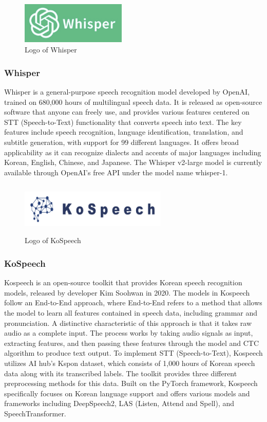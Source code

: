 \documentclass[conference]{IEEEtran}
\begin{document}
        \begin{figure}[htbp]
            \centerline{\includegraphics[width=5cm, height=2cm]{Images/logo/whisper.png}}
            \caption{Logo of Whisper}
            \label{fig}
        \end{figure}
        \subsubsection{Whisper}
            Whisper is a general-purpose speech recognition model developed by OpenAI, trained on 680,000 hours of multilingual speech data. It is released as open-source software that anyone can freely use, and provides various features centered on STT (Speech-to-Text) functionality that converts speech into text. The key features include speech recognition, language identification, translation, and subtitle generation, with support for 99 different languages. It offers broad applicability as it can recognize dialects and accents of major languages including Korean, English, Chinese, and Japanese. The Whisper v2-large model is currently available through OpenAI's free API under the model name whisper-1.

        \begin{figure}[htbp]
            \centerline{\includegraphics[width=7cm, height=2.5cm]{Images/logo/kospeech.png}}
            \caption{Logo of KoSpeech}
            \label{fig}
        \end{figure}
        \subsubsection{KoSpeech}
            Kospeech is an open-source toolkit that provides Korean speech recognition models, released by developer Kim Soohwan in 2020. The models in Kospeech follow an End-to-End approach, where End-to-End refers to a method that allows the model to learn all features contained in speech data, including grammar and pronunciation. A distinctive characteristic of this approach is that it takes raw audio as a complete input. The process works by taking audio signals as input, extracting features, and then passing these features through the model and CTC algorithm to produce text output. To implement STT (Speech-to-Text), Kospeech utilizes AI hub's Kspon dataset, which consists of 1,000 hours of Korean speech data along with its transcribed labels. The toolkit provides three different preprocessing methods for this data. Built on the PyTorch framework, Kospeech specifically focuses on Korean language support and offers various models and frameworks including DeepSpeech2, LAS (Listen, Attend and Spell), and SpeechTransformer.
\end{document}
